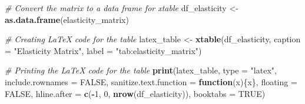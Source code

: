 \documentclass[
]{article}
\newenvironment{Shaded}{\begin{snugshade}}{\end{snugshade}}
\newcommand{\AttributeTok}[1]{\textcolor[rgb]{0.13,0.29,0.53}{#1}}
\newcommand{\CommentTok}[1]{\textcolor[rgb]{0.56,0.35,0.01}{\textit{#1}}}
\newcommand{\ConstantTok}[1]{\textcolor[rgb]{0.56,0.35,0.01}{#1}}
\newcommand{\ControlFlowTok}[1]{\textcolor[rgb]{0.13,0.29,0.53}{\textbf{#1}}}
\newcommand{\DecValTok}[1]{\textcolor[rgb]{0.00,0.00,0.81}{#1}}
\newcommand{\FunctionTok}[1]{\textcolor[rgb]{0.13,0.29,0.53}{\textbf{#1}}}
\newcommand{\NormalTok}[1]{#1}
\newcommand{\OtherTok}[1]{\textcolor[rgb]{0.56,0.35,0.01}{#1}}
\newcommand{\SpecialCharTok}[1]{\textcolor[rgb]{0.81,0.36,0.00}{\textbf{#1}}}
\newcommand{\StringTok}[1]{\textcolor[rgb]{0.31,0.60,0.02}{#1}}
\begin{document}
\begin{Shaded}
\begin{Highlighting}[]
\CommentTok{\# Convert the matrix to a data frame for xtable}
\NormalTok{df\_elasticity }\OtherTok{\textless{}{-}} \FunctionTok{as.data.frame}\NormalTok{(elasticity\_matrix)}

\CommentTok{\# Creating LaTeX code for the table}
\NormalTok{latex\_table }\OtherTok{\textless{}{-}} \FunctionTok{xtable}\NormalTok{(df\_elasticity, }\AttributeTok{caption =} \StringTok{"Elasticity Matrix"}\NormalTok{, }\AttributeTok{label =} \StringTok{"tab:elasticity\_matrix"}\NormalTok{)}

\CommentTok{\# Printing the LaTeX code for the table}
\FunctionTok{print}\NormalTok{(latex\_table, }\AttributeTok{type =} \StringTok{"latex"}\NormalTok{, }\AttributeTok{include.rownames =} \ConstantTok{FALSE}\NormalTok{, }
      \AttributeTok{sanitize.text.function =} \ControlFlowTok{function}\NormalTok{(x)\{x\},}
      \AttributeTok{floating =} \ConstantTok{FALSE}\NormalTok{, }
      \AttributeTok{hline.after =} \FunctionTok{c}\NormalTok{(}\SpecialCharTok{{-}}\DecValTok{1}\NormalTok{, }\DecValTok{0}\NormalTok{, }\FunctionTok{nrow}\NormalTok{(df\_elasticity)), }
      \AttributeTok{booktabs =} \ConstantTok{TRUE}\NormalTok{)}
\end{Highlighting}
\end{Shaded}
\end{document}
